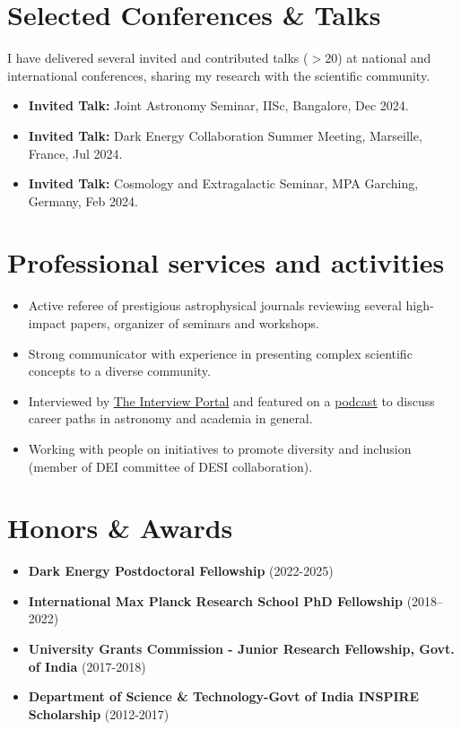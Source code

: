 \documentclass[a4paper,11pt]{article}
\begin{document}
\section*{Selected Conferences \& Talks}
I have delivered several invited and contributed talks ($>20$) at national and international conferences, sharing my research with the scientific community.
\begin{itemize}[noitemsep, topsep=0pt]
\item \textbf{Invited Talk:} Joint Astronomy Seminar, IISc, Bangalore, Dec 2024.
\item \textbf{Invited Talk:} Dark Energy Collaboration Summer Meeting, Marseille, France, Jul 2024.
    \item \textbf{Invited Talk:} Cosmology and Extragalactic Seminar, MPA Garching, Germany, Feb 2024.
\end{itemize}

\section*{Professional services and activities}
\begin{itemize}[noitemsep, topsep=0pt]
    \item Active referee of prestigious astrophysical journals reviewing several high-impact papers, organizer of seminars and workshops.
     \item Strong communicator with experience in presenting complex scientific concepts to a diverse community.
    \item Interviewed by \href{https://theinterviewportal.com/2020/03/13/astrophysicist-interview-8/}{The Interview Portal} and featured on a \href{https://www.youtube.com/watch?v=WmA_PnYLeCg}{podcast} to discuss career paths in astronomy and academia in general.
    \item Working with people on initiatives to promote diversity and inclusion (member of DEI committee of DESI collaboration).
\end{itemize}

\section*{Honors \& Awards}
\begin{itemize}[noitemsep, topsep=0pt]
 \item \textbf{Dark Energy Postdoctoral Fellowship} (2022-2025)
    \item \textbf{International Max Planck Research School PhD Fellowship} (2018–2022)
    \item \textbf{University Grants Commission - Junior Research Fellowship, Govt. of India} (2017-2018)
     \item \textbf{Department of Science \& Technology-Govt of India INSPIRE Scholarship}  (2012-2017)
\end{itemize}
\end{document}
